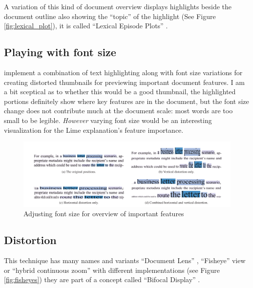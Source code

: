 \documentclass{l4proj}
\begin{document}
A variation of this kind of document overview displays highlights beside the document outline also showing the ``topic'' of the highlight (See Figure \ref{fig:lexical_plot}), it is called ``Lexical Episode Plots'' \autocite{el-assadyVisArgueVisualText2016,goldExploratoryTextAnalysis2015}.

\subsection{Playing with font size}

\textcite{stoffelDocumentThumbnailsVariable2012} implement a combination of text highlighting along with font size variations for creating distorted thumbnails for previewing important document features.
I am a bit sceptical as to whether this would be a good thumbnail, the highlighted portions definitely show where key features are in the document, but the font size change does not contribute much at the document scale: most words are too small to be legible.
\textit{However} varying font size would be an interesting visualization for the Lime explanation's feature importance.

\begin{figure}[H]
    \centering
    \includegraphics[width=\textwidth]{images/document_visualization/font-size.png}
    \caption{Adjusting font size for overview of important features \\ \protect\autocite{stoffelDocumentThumbnailsVariable2012}}
    \label{fig:font-size}
\end{figure}


\subsection{Distortion}

This technique has many names and variants ``Document Lens'' \autocite{robertsonDocumentLens1993}, ``Fisheye'' view \autocite{greenbergFisheyeTextEditor1996} or ``hybrid continuous zoom'' \autocite{bartramContinuousZoomConstrained1995} with different implementations (see Figure \ref{fig:fisheyes}) they are part of a concept called ``Bifocal Display'' \autocite{apperleyBifocalDisplay}.
\end{document}
